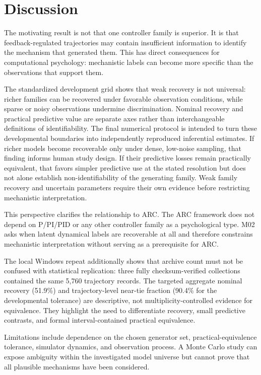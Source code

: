 \section{Discussion}

The motivating result is not that one controller family is superior. It is that feedback-regulated trajectories may contain insufficient information to identify the mechanism that generated them. This has direct consequences for computational psychology: mechanistic labels can become more specific than the observations that support them.

The standardized development grid shows that weak recovery is not universal: richer families can be recovered under favorable observation conditions, while sparse or noisy observations undermine discrimination. Nominal recovery and practical predictive value are separate axes rather than interchangeable definitions of identifiability. The final numerical protocol is intended to turn these developmental boundaries into independently reproduced inferential estimates. If richer models become recoverable only under dense, low-noise sampling, that finding informs human study design. If their predictive losses remain practically equivalent, that favors simpler predictive use at the stated resolution but does not alone establish non-identifiability of the generating family. Weak family recovery and uncertain parameters require their own evidence before restricting mechanistic interpretation.

This perspective clarifies the relationship to ARC. The ARC framework does not depend on P/PI/PID or any other controller family as a psychological type. M02 asks when latent dynamical labels are recoverable at all and therefore constrains mechanistic interpretation without serving as a prerequisite for ARC.

The local Windows repeat additionally shows that archive count must not be confused with statistical replication: three fully checksum-verified collections contained the same 5,760 trajectory records. The targeted aggregate nominal recovery (51.9\%) and trajectory-level near-tie fraction (90.4\% for the developmental tolerance) are descriptive, not multiplicity-controlled evidence for equivalence. They highlight the need to differentiate recovery, small predictive contrasts, and formal interval-contained practical equivalence.

Limitations include dependence on the chosen generator set, practical-equivalence tolerance, simulator dynamics, and observation process. A Monte Carlo study can expose ambiguity within the investigated model universe but cannot prove that all plausible mechanisms have been considered.


